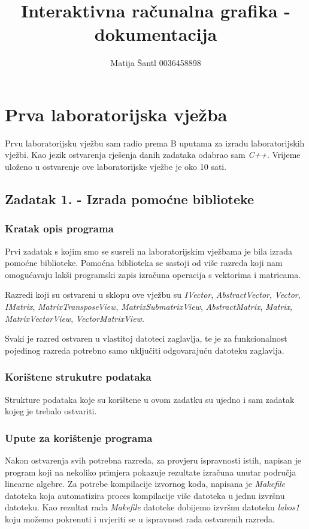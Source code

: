 \documentclass[oneside]{scrbook}
\author{Matija Šantl 0036458898}
\title{Interaktivna računalna grafika - dokumentacija}
\begin{document}
\maketitle
\tableofcontents

\chapter{Prva laboratorijska vježba}
Prvu laboratorijsku vježbu sam radio prema B uputama za izradu laboratorijskih vježbi. Kao jezik ostvarenja rješenja danih zadataka odabrao sam \textit{C++}. Vrijeme uloženo u ostvarenje ove laboratorijske vježbe je oko 10 sati. 

\section{Zadatak 1. - Izrada pomoćne biblioteke}
\subsection{Kratak opis programa}
Prvi zadatak s kojim smo se susreli na laboratorijskim vježbama je bila izrada pomoćne biblioteke. Pomoćna biblioteka se sastoji od više razreda koji nam omogućavaju lakši programski zapis izračuna operacija s vektorima i matricama.

Razredi koji su ostvareni u sklopu ove vježbu su \textit{IVector}, \textit{AbstractVector}, \textit{Vector}, \textit{IMatrix}, \textit{MatrixTransposeView}, \textit{MatrixSubmatrixView}, \textit{AbstractMatrix}, \textit{Matrix}, \textit{MatrixVectorView}, \textit{VectorMatrixView}.

Svaki je razred ostvaren u vlastitoj datoteci zaglavlja, te je za funkcionalnost pojedinog razreda potrebno samo uključiti odgovarajuću datoteku zaglavlja.

\subsection{Korištene strukutre podataka}
Strukture podataka koje su korištene u ovom zadatku su ujedno i sam zadatak kojeg je trebalo ostvariti.

\subsection{Upute za korištenje programa}
Nakon ostvarenja svih potrebna razreda, za provjeru ispravnosti istih, napisan je program koji na nekoliko primjera pokazuje rezultate izračuna unutar područja linearne algebre. Za potrebe kompilacije izvornog koda, napisana je \textit{Makefile} datoteka koja automatizira proces kompilacije više datoteka u jednu izvršnu datoteku. Kao rezultat rada \textit{Makefile} datoteke dobijemo izvršnu datoteku \textit{labos1} koju možemo pokrenuti i uvjeriti se u ispravnost rada ostvarenih razreda.
\end{document}
